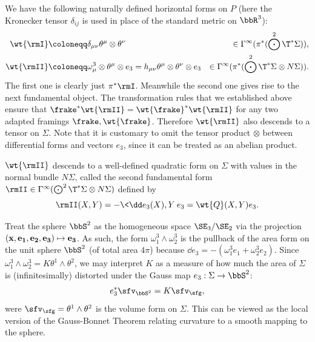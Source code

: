 We have the following naturally defined horizontal forms on $P$ (here the Kronecker tensor $\delta_{ij}$ is used in place of the standard metric on $\bbR^3$):
\begin{align}
    \wt{\rmI}&\coloneqq \delta_{\mu\nu} \theta^\mu\otimes\theta^\nu &\in\Gamma^\infty(\pi^\ast(\bigodot^2 \T^\ast \Sigma)),\\
    \wt{\rmII}&\coloneqq \omega^3_\mu\otimes\theta^\mu\otimes e_3=
    h_{\mu\nu}\theta^\mu\otimes\theta^\nu\otimes e_3
    &\in \Gamma^\infty(\pi^\ast(\bigodot^2 \T^\ast \Sigma\otimes N\Sigma)).
\end{align}
The first one is clearly just $\pi^\ast\rmI$. Meanwhile the second one gives rise to the next fundamental object. The transformation rules that we established above ensure that $\frake^\ast \wt{\rmII}=\wt{\frake}^\ast \wt{\rmII}$ for any two adapted framings $\frake,\wt{\frake}$. Therefore $\wt{\rmII}$ also descends to a tensor on $\Sigma$. Note that it is customary to omit the tensor product $\otimes$ between differential forms and vectors $e_3$, since it can be treated as an abelian product.

\begin{defn}
    $\wt{\rmII}$ descends to a well-defined quadratic form on $\Sigma$ with values in the normal bundle $N\Sigma$, called the second fundamental form $\rmII\in\Gamma^\infty(\bigodot^2\T^\ast\Sigma\otimes N\Sigma)$ defined by
    \[\rmII(X,Y)=-\<\dd e_3(X),Y\>e_3=\wt{Q}(X,Y)e_3.\]
\end{defn}

\begin{rem}
    Treat the sphere $\bbS^2$ as the homogeneous space $\SE_3\slash\SE_2$ via the projection $(\bf{x},e_1,e_2,e_3)\mapsto e_3$. As such, the form $\omega_1^3\wedge\omega_2^3$ is the pullback of the area form on the unit sphere $\bbS^2$ (of total area $4\pi$) because $\dd e_3=-(\omega_1^3 e_1+\omega_2^3 e_2)$. Since $\omega_1^3\wedge\omega_2^3=K\theta^1\wedge\theta^2$, we may interpret $K$ as a measure of how much the area of $\Sigma$ is (infinitesimally) distorted under the Gauss map $e_3:\Sigma\to \bbS^2$:
    \[e_3^\ast \sfv_{\bbS^2}=K\sfv_{\sfg},\label{eq gauss map pullback}\]
    were $\sfv_\sfg=\theta^1\wedge\theta^2$ is the volume form on $\Sigma$. This can be viewed as the local version of the Gauss-Bonnet Theorem relating curvature to a smooth mapping to the sphere.
\end{rem}

